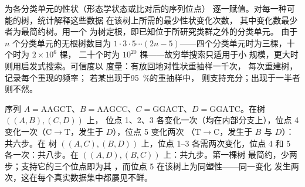 \begin{method}[简约法]\label{meth:b2:phylogenetic-trees:parsimony}
为各分类单元的性状（形态学状态或比对后的序列位点）
逐一赋值。对每一种可能的树，统计解释这些数据
在该树上所需的最少性状变化次数，
其中变化数最少者为最简约树。用一个
\emph{}为树定根，即已知位于所研究类群之外的分类单元。
由于 $n$ 个分类单元的无根树数目为 $1\cdot 3\cdot
5\cdots(2n - 5)$——四个分类单元时为三棵，十个时为 $2\times 10^{6}$ 棵，
二十个时为 $10^{20}$ 棵——故穷举搜索只适用于小
规模，更大时则用启发式搜索。可信度以
\emph{}度量：有放回地对性状重抽样一千次，
每次重建树，记录每个重现的频率；
若某出现于\qty{95}{\%}的重抽样中，
则支持充分；出现于一半者则不然。
\end{method}

\begin{example}\label{ex:b2:phylogenetic-trees:parsimony}
序列 $A = \mathrm{AAGCT}$、$B = \mathrm{AAGCC}$、$C =
\mathrm{GGACT}$、$D = \mathrm{GGATC}$。在树 $((A,B),(C,D))$ 上，
位点 1、2、3 各变化一次（均在内部分支上），位点 4
变化一次（$\mathrm{C}\to\mathrm{T}$，发生于 $D$），位点 5 变化两次
（$\mathrm{T}\to\mathrm{C}$，发生于 $B$ 与 $D$）：共六步。在
树 $((A,C),(B,D))$ 上，位点 1--3 各需两次变化，位点 4 和 5
各一次：共八步。在 $((A,D),(B,C))$ 上：共九步。第一棵树
最简约，少两步；支持它的三个位点即为其
，而位点 5 在该树上为同塑性——同一变化
发生两次，这在每个真实数据集中都屡见不鲜。
\end{example}


